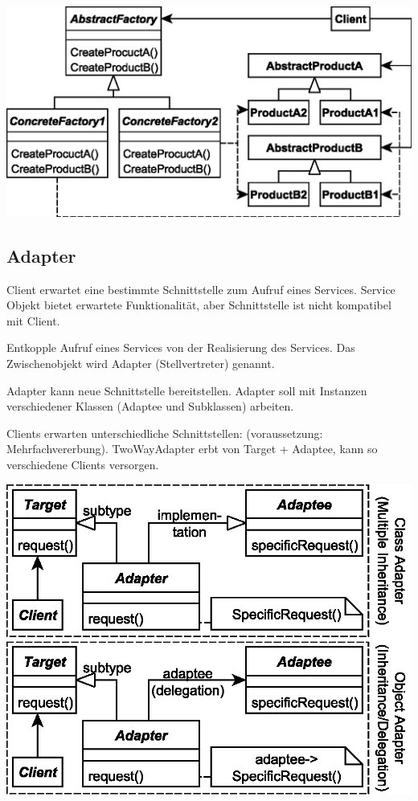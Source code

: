 \documentclass[a4paper,fontsize=9pt, DIV=calc]{scrartcl}
\begin{document}
\begin{multicols}{2}
\includegraphics[width=\columnwidth]{new/abstractfactory}

\subsection{Adapter}
\begin{description}[leftmargin=*]\itemsep-2mm
\item[Motivation / Problem] Client erwartet eine bestimmte Schnittstelle zum Aufruf eines Services. Service Objekt bietet erwartete Funktionalität, aber Schnittstelle ist nicht kompatibel mit Client.
\item[Lösung] Entkopple Aufruf eines Services von der Realisierung des Services. Das Zwischenobjekt wird Adapter (Stellvertreter) genannt.
\item[Konsequenzen] Adapter kann neue Schnittstelle bereitstellen. Adapter soll mit Instanzen verschiedener Klassen (Adaptee und Subklassen) arbeiten. 
\item[Two-Way-Adapter] Clients erwarten unterschiedliche Schnittstellen: (voraussetzung: Mehrfachvererbung). TwoWayAdapter erbt von Target + Adaptee, kann so verschiedene Clients versorgen. 
\end{description}

\begin{center}
	\includegraphics[width=0.85\columnwidth]{./new/adapter}
\end{center}


\end{multicols}
\end{document}
